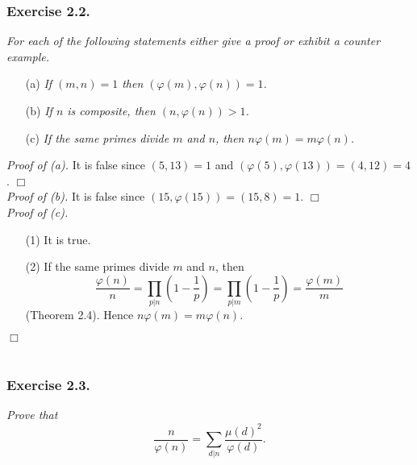 \documentclass{article}
\begin{document}
\subsubsection*{Exercise 2.2.}
\emph{For each of the following statements either give a proof or
exhibit a counter example.}
\begin{enumerate}
\item[(a)]
  \emph{If $(m,n)=1$ then $(\varphi(m),\varphi(n)) = 1$.}

\item[(b)]
  \emph{If $n$ is composite, then $(n,\varphi(n)) > 1$.}

\item[(c)]
  \emph{If the same primes divide $m$ and $n$, then $n\varphi(m) = m \varphi(n)$.} \\
\end{enumerate}



\emph{Proof of (a).}
  It is false since $(5, 13) = 1$ and $(\varphi(5),\varphi(13)) = (4, 12) = 4$.
$\Box$ \\


\emph{Proof of (b).}
  It is false since $(15, \varphi(15)) = (15, 8) = 1$.
$\Box$ \\


\emph{Proof of (c).}
\begin{enumerate}
\item[(1)]
  It is true.

\item[(2)]
  If the same primes divide $m$ and $n$, then
  \[
    \frac{\varphi(n)}{n}
    = \prod_{p|n}\left( 1 - \frac{1}{p} \right)
    = \prod_{p|m}\left( 1 - \frac{1}{p} \right)
    = \frac{\varphi(m)}{m}
  \]
  (Theorem 2.4).
  Hence $n\varphi(m) = m \varphi(n)$.
\end{enumerate}
$\Box$ \\\\






\subsubsection*{Exercise 2.3.}
\emph{Prove that}
\[
  \frac{n}{\varphi(n)} = \sum_{d|n} \frac{\mu(d)^2}{\varphi(d)}.
\]
\end{document}
